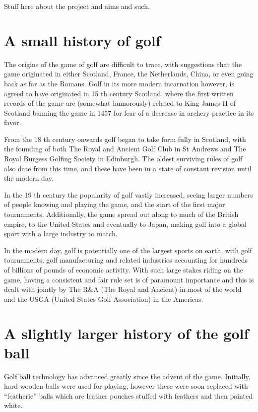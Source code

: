 Stuff here about the project and aims and such.

\section{A small history of golf}

The origins of the game of golf are difficult to trace, with suggestions that the game originated
in either Scotland, France, the Netherlands, China, or even going back as far as the Romans.
Golf in its more modern incarnation however, is agreed to have originated in 15 th century
Scotland, where the first written records of the game are (somewhat humorously) related to
King James II of Scotland banning the game in 1457 for fear of a decrease in archery practice
in its favor.

From the 18 th century onwards golf began to take form fully in Scotland, with the founding
of both The Royal and Ancient Golf Club in St Andrews and The Royal Burgess Golfing Society
in Edinburgh. The oldest surviving rules of golf also date from this time, and these have been
in a state of constant revision until the modern day.

In the 19 th century the popularity of golf vastly increased, seeing larger numbers of people
knowing and playing the game, and the start of the first major tournaments. Additionally, the
game spread out along to much of the British empire, to the United States and eventually to
Japan, making golf into a global sport with a large industry to match.

In the modern day, golf is potentially one of the largest sports on earth, with golf tournaments,
golf manufacturing and related industries accounting for hundreds of billions of pounds of
economic activity. With such large stakes riding on the game, having a consistent and fair rule
set is of paramount importance and this is dealt with jointly by The R\&A (The Royal and
Ancient) in most of the world and the USGA (United States Golf Association) in the Americas.

\section{A slightly larger history of the golf ball}

Golf ball technology has advanced greatly since the advent of the game. Initially, hard wooden
balls were used for playing, however these were soon replaced with “featherie” balls which are
leather pouches stuffed with feathers and then painted white.


